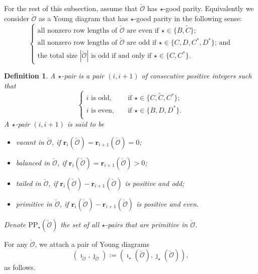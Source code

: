 \documentclass[12pt,a4paper]{amsart}
\def\abs#1{\left|{#1}\right|}
\newcommand{\CO}{{\mathcal {O}}}
\numberwithin{equation}{section}
\newtheorem{defn}[thm]{Definition}
\theoremstyle{remark}
\begin{document}
For the rest of this subsection, assume that $\check \CO$ has  $\star$-good parity. Equivalently we consider $\check \CO$ as a Young diagram that has $\star$-good parity in the following sense:
\[
  \left\{ \begin{array}{l}
               \textrm{all nonzero row lengths of $\check \CO$ are even if $\star\in \{B, \widetilde{C}\}$;}\\
                     \textrm{all nonzero row lengths of $\check \CO$ are odd if $\star\in \{C, D, C^*, D^*\}$; and}\\
                        \textrm{the total size $\abs{\check \CO}$ is  odd if and only if $\star\in \{C, C^*\}$}.                   \end{array}
                 \right.
\]


\begin{defn}
 A $\star$-pair is a pair  $(i,i+1)$ of consecutive positive integers such that
\[
   \left\{
     \begin{array}{ll}
      i\textrm{ is odd}, \quad &\textrm{if $\star\in\{C, \widetilde{C}, C^*\}$};  \\
      i \textrm{ is even}, \quad &\textrm{if $\star\in\{B, D, D^*\}$}. \\
       \end{array}
   \right.
\]
A $\star$-pair   $(i,i+1)$ is said to be
\begin{itemize}
\item
vacant in $\check \CO$, if $\mathbf r_i(\check \CO)=\mathbf r_{i+1}(\check \CO)=0$;
\item
balanced in $\check \CO$,  if  $\mathbf r_i(\check \CO)=\mathbf r_{i+1}(\check \CO)>0$;
\item
tailed in $\check \CO$,  if  $\mathbf r_i(\check \CO)-\mathbf r_{i+1}(\check \CO)$ is positive and odd;
\item
primitive in $\check \CO$, if    $\mathbf r_i(\check \CO)-\mathbf r_{i+1}(\check \CO)$ is positive and even.
\end{itemize}
Denote $\mathrm{PP}_\star(\check \CO)$ the  set of all $\star$-pairs that are primitive in $\check \CO$.
\end{defn}

For any $\check \CO$, we attach a pair of Young diagrams
\[
(\imath_{\check \CO}, \jmath_{\check \CO}):=(\imath_\star(\check \CO), \jmath_\star(\check \CO)),
\]
as follows.
\end{document}
